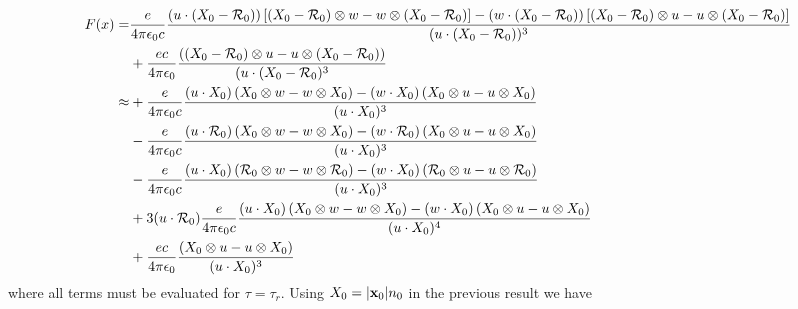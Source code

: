 \begin{align}
    {F}(x)  = & \frac{e}{4\pi\epsilon_0c}\frac{(u\cdot (X_0-{\cal R}_0))\left[(X_0-{\cal R}_0)\otimes w-w\otimes (X_0-{\cal R}_0)\right]-(w\cdot (X_0-{\cal R}_0))\left[(X_0-{\cal R}_0)\otimes u- u \otimes (X_0-{\cal R}_0)\right]}{(u\cdot (X_0-{\cal R}_0))^3} \nonumber \\
              & +\frac{ec}{4\pi\epsilon_0}\frac{((X_0-{\cal R}_0)\otimes u- u \otimes (X_0-{\cal R}_0))}{(u\cdot (X_0-{\cal R}_0)^3}\nonumber                                                                                                                                        \\
    \approx   & +\frac{e}{4\pi\epsilon_0c}\frac{(u\cdot X_0)\left(X_0\otimes w-w\otimes X_0\right)-(w\cdot X_0)\left(X_0\otimes u- u \otimes X_0\right)}{(u\cdot X_0)^3}\nonumber                                                                                            \\
              & -\frac{e}{4\pi\epsilon_0c}\frac{(u\cdot {\cal R}_0)\left(X_0\otimes w-w\otimes X_0\right)-(w\cdot {\cal R}_0)\left(X_0\otimes u- u \otimes X_0\right)}{(u\cdot X_0)^3}\nonumber                                                                              \\
              & -\frac{e}{4\pi\epsilon_0c}\frac{(u\cdot X_0)\left({\cal R}_0\otimes w-w\otimes {\cal R}_0\right)-(w\cdot X_0)\left({\cal R}_0\otimes u- u \otimes {\cal R}_0\right)}{(u\cdot X_0)^3}\nonumber                                                                \\
              & +3(u\cdot {\cal R}_0)\frac{e}{4\pi\epsilon_0c}\frac{(u\cdot X_0)\left(X_0\otimes w-w\otimes X_0\right)-(w\cdot X_0)\left(X_0\otimes u- u \otimes X_0\right)}{(u\cdot X_0)^4}\nonumber                                                                        \\
              & +\frac{ec}{4\pi\epsilon_0}\frac{(X_0\otimes u- u \otimes X_0)}{(u\cdot X_0)^3}
\end{align}
where all terms must be evaluated for $\tau=\tau_r$. Using $X_0=|{\bf x}_0|n_0$ in the previous result we have
